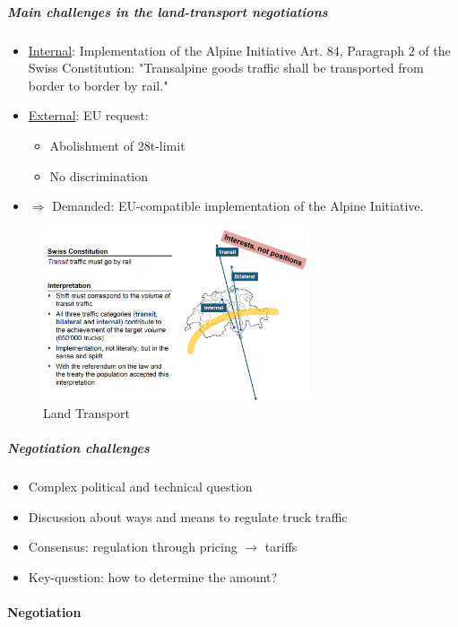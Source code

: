 \subparagraph{Main challenges in the land-transport negotiations}

\begin{itemize}
    \item \underline{Internal}: Implementation of the Alpine Initiative Art. 84, Paragraph
        $2$ of the Swiss Constitution: "Transalpine goods traffic shall be
        transported from border to border by rail."
    \item \underline{External}: EU request:
        \begin{itemize}
            \item Abolishment of $28$t-limit
            \item No discrimination
        \end{itemize}
    \item $\Rightarrow$ Demanded: EU-compatible implementation of the
        Alpine Initiative.
\end{itemize}

\begin{figure}[h]
    \centering
    \includegraphics[width=0.7\textwidth]{Pictures/EU_CH_land_transport.png}
    \caption{Land Transport}
\end{figure}

\subparagraph{Negotiation challenges}

\begin{itemize}
    \item Complex political and technical question
    \item Discussion about ways and means to regulate truck traffic
    \item Consensus: regulation through pricing $\rightarrow$ tariffs
    \item Key-question: how to determine the amount?
\end{itemize}

\paragraph{Negotiation}

